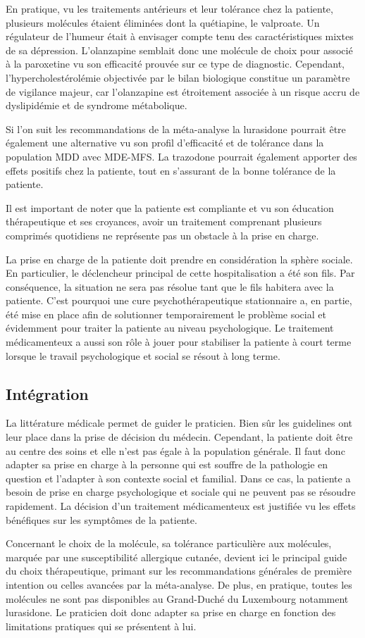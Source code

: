 En pratique, vu les traitements antérieurs et leur tolérance chez la patiente, plusieurs molécules étaient éliminées dont la quétiapine, le valproate. Un régulateur de l’humeur était à envisager compte tenu des caractéristiques mixtes de sa dépression. L'olanzapine semblait donc une molécule de choix pour associé à la paroxetine vu son efficacité prouvée sur ce type de diagnostic. Cependant, l'hypercholestérolémie objectivée par le bilan biologique constitue un paramètre de vigilance majeur, car l'olanzapine est étroitement associée à un risque accru de dyslipidémie et de syndrome métabolique.

Si l’on suit les recommandations de la méta-analyse la lurasidone pourrait être également une alternative vu son profil d’efficacité et de tolérance dans la population MDD avec MDE-MFS. La trazodone pourrait également apporter des effets positifs chez la patiente, tout en s’assurant de la bonne tolérance de la patiente.

Il est important de noter que la patiente est compliante et vu son éducation thérapeutique et ses croyances, avoir un traitement comprenant plusieurs comprimés quotidiens ne représente pas un obstacle à la prise en charge.

La prise en charge de la patiente doit prendre en considération la sphère sociale. En particulier, le déclencheur principal de cette hospitalisation a été son fils. Par conséquence, la situation ne sera pas résolue tant que le fils habitera avec la patiente. C’est pourquoi une cure psychothérapeutique stationnaire a, en partie, été mise en place afin de solutionner temporairement le problème social et évidemment pour traiter la patiente au niveau psychologique. Le traitement médicamenteux a aussi son rôle à jouer pour stabiliser la patiente à court terme lorsque le travail psychologique et social se résout à long terme. 

\subsection{Intégration}
La littérature médicale permet de guider le praticien. Bien sûr les guidelines ont leur place dans la prise de décision du médecin. Cependant, la patiente doit être au centre des soins et elle n’est pas égale à la population générale. Il faut donc adapter sa prise en charge à la personne qui est souffre de la pathologie en question et l’adapter à son contexte social et familial. Dans ce cas, la patiente a besoin de prise en charge psychologique et sociale qui ne peuvent pas se résoudre rapidement. La décision d’un traitement médicamenteux est justifiée vu les effets bénéfiques sur les symptômes de la patiente.

Concernant le choix de la molécule, sa tolérance particulière aux molécules, marquée par une susceptibilité allergique cutanée, devient ici le principal guide du choix thérapeutique, primant sur les recommandations générales de première intention ou celles avancées par la méta-analyse. De plus, en pratique, toutes les molécules ne sont pas disponibles au Grand-Duché du Luxembourg notamment lurasidone. Le praticien doit donc adapter sa prise en charge en fonction des limitations pratiques qui se présentent à lui.